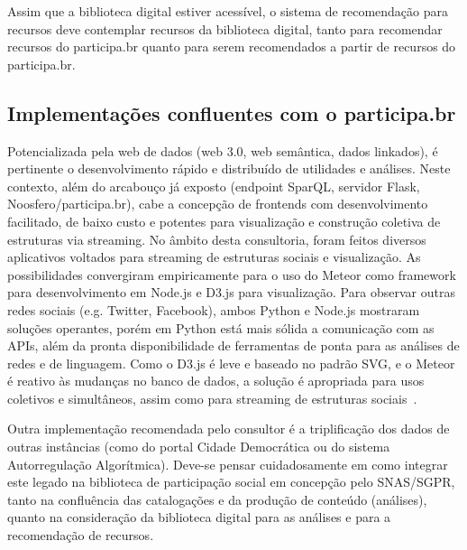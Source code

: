 \documentclass[12pt]{article}
\begin{document}
Assim que a biblioteca digital estiver acessível, o sistema de recomendação para recursos deve contemplar recursos da biblioteca digital, tanto para recomendar recursos do participa.br quanto para serem recomendados a partir de recursos do participa.br.

\subsection{Implementações confluentes com o participa.br}
Potencializada pela web de dados (web 3.0, web semântica, dados linkados),
é pertinente o desenvolvimento rápido e distribuído de utilidades e análises. Neste contexto, além do arcabouço já exposto (endpoint SparQL, servidor Flask, Noosfero/participa.br), cabe a concepção de frontends com desenvolvimento facilitado, de baixo custo e potentes para visualização e construção coletiva de estruturas via streaming. No âmbito desta consultoria, foram feitos diversos aplicativos voltados para streaming de estruturas sociais e visualização. As possibilidades convergiram empiricamente para o uso do Meteor como framework para desenvolvimento em Node.js e D3.js para visualização. Para observar outras redes sociais (e.g. Twitter, Facebook), ambos Python e Node.js mostraram soluções operantes, porém em Python está mais sólida a comunicação com as APIs, além da pronta disponibilidade de ferramentas de ponta para as análises de redes e de linguagem. Como o D3.js é leve e baseado no padrão SVG, e o Meteor é reativo às mudanças no banco de dados, a solução é apropriada para usos coletivos e simultâneos, assim como para streaming de estruturas sociais~\cite{teloes,oscs,mm,mmissa,mynsa}.

Outra implementação recomendada pelo consultor é a triplificação dos dados de outras instâncias (como do portal Cidade Democrática ou do sistema Autorregulação Algorítmica). Deve-se pensar cuidadosamente em como integrar este legado na biblioteca de participação social em concepção pelo SNAS/SGPR, tanto na confluência das catalogações e da produção de conteúdo (análises), quanto na consideração da biblioteca digital para as análises e para a recomendação de recursos.
\end{document}
